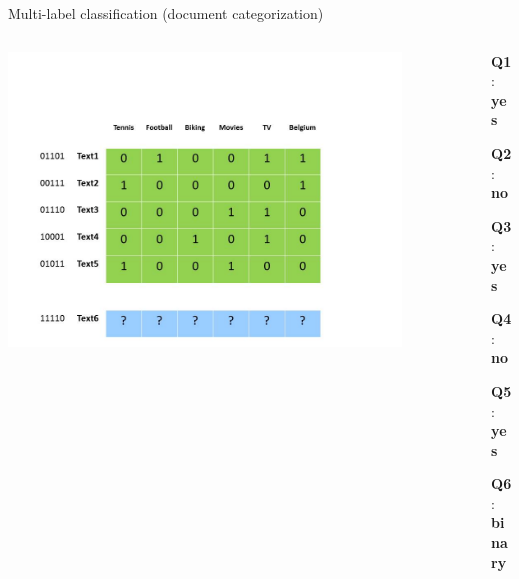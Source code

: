 \documentclass[]{beamer}
\begin{document}
\begin{frame}
{Multi-label classification (document categorization)}

\begin{columns}

\begin{column}{9cm}
\includegraphics[width=0.9\textwidth,trim = 0 0 100 100,clip]{Figures/pictures/Slide2}
\end{column}

\begin{column}{7cm}
\begin{itemize}
\itemindent=2pt    \item [\textbf{Q1}:] \textbf{yes}
\itemindent=2pt    \item [\textbf{Q2}:] \textbf{no}
\itemindent=2pt    \item [\textbf{Q3}:] \textbf{yes}
\itemindent=2pt    \item [\textbf{Q4}:] \textbf{no}
\itemindent=2pt    \item [\textbf{Q5}:] \textbf{yes}
\itemindent=2pt    \item [\textbf{Q6}:]  \textbf{binary}
\end{itemize}
\end{column}

\end{columns}
\end{frame}
\end{document}

